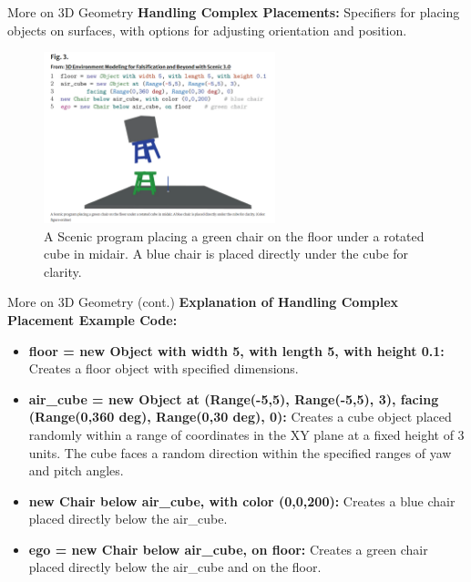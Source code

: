 \documentclass[10pt]{beamer}
\begin{document}
\begin{frame}{More on 3D Geometry}
    \textbf{Handling Complex Placements:} Specifiers for placing objects on surfaces, with options for adjusting orientation and position.
    \begin{figure}
        \centering
        \includegraphics[width=0.6\textwidth]{FIG3.png}
        \caption{A Scenic program placing a green chair on the floor under a rotated cube in midair. A blue chair is placed directly under the cube for clarity.}
        \label{fig:complex-placements}
    \end{figure}
\end{frame}

\begin{frame}{More on 3D Geometry (cont.)}
    \textbf{Explanation of Handling Complex Placement Example Code:}\\
    \begin{itemize}
        \item \textbf{floor = new Object with width 5, with length 5, with height 0.1:} Creates a floor object with specified dimensions.
        \item \textbf{air\_cube = new Object at (Range(-5,5), Range(-5,5), 3), facing (Range(0,360 deg), Range(0,30 deg), 0):} Creates a cube object placed randomly within a range of coordinates in the XY plane at a fixed height of 3 units. The cube faces a random direction within the specified ranges of yaw and pitch angles.
        \item \textbf{new Chair below air\_cube, with color (0,0,200):} Creates a blue chair placed directly below the air\_cube.
        \item \textbf{ego = new Chair below air\_cube, on floor:} Creates a green chair placed directly below the air\_cube and on the floor.
    \end{itemize}
\end{frame}
\end{document}

